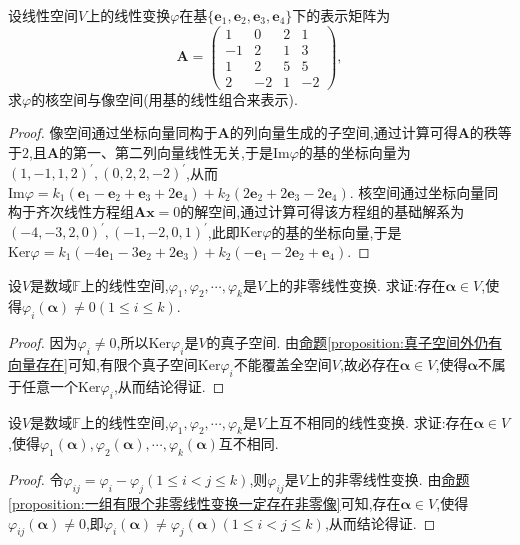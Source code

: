 \documentclass[lang=cn,newtx,10pt,scheme=chinese]{elegantbook}
\begin{document}
\begin{example}
设线性空间\(V\)上的线性变换\(\varphi\)在基\(\{\boldsymbol{e}_1,\boldsymbol{e}_2,\boldsymbol{e}_3,\boldsymbol{e}_4\}\)下的表示矩阵为
\[
\boldsymbol{A}=\begin{pmatrix}
1&0&2&1\\
-1&2&1&3\\
1&2&5&5\\
2&-2&1&-2
\end{pmatrix},
\]
求\(\varphi\)的核空间与像空间(用基的线性组合来表示).
\end{example}
\begin{proof}
像空间通过坐标向量同构于\(\boldsymbol{A}\)的列向量生成的子空间,通过计算可得\(\boldsymbol{A}\)的秩等于\(2\),且\(\boldsymbol{A}\)的第一、第二列向量线性无关,于是\(\text{Im}\varphi\)的基的坐标向量为\((1,-1,1,2)^\prime,(0,2,2,-2)^\prime\),从而\(\text{Im}\varphi = k_1(\boldsymbol{e}_1 - \boldsymbol{e}_2 + \boldsymbol{e}_3 + 2\boldsymbol{e}_4)+k_2(2\boldsymbol{e}_2 + 2\boldsymbol{e}_3 - 2\boldsymbol{e}_4)\). 核空间通过坐标向量同构于齐次线性方程组\(\boldsymbol{A}\boldsymbol{x}=0\)的解空间,通过计算可得该方程组的基础解系为\((-4,-3,2,0)^\prime,(-1,-2,0,1)^\prime\),此即\(\text{Ker}\varphi\)的基的坐标向量,于是\(\text{Ker}\varphi = k_1(-4\boldsymbol{e}_1 - 3\boldsymbol{e}_2 + 2\boldsymbol{e}_3)+k_2(-\boldsymbol{e}_1 - 2\boldsymbol{e}_2 + \boldsymbol{e}_4)\).
\end{proof}

\begin{proposition}\label{proposition:一组有限个非零线性变换一定存在非零像}
设\(V\)是数域\(\mathbb{F}\)上的线性空间,\(\varphi_1,\varphi_2,\cdots,\varphi_k\)是\(V\)上的非零线性变换. 求证:存在\(\boldsymbol{\alpha}\in V\),使得\(\varphi_i(\boldsymbol{\alpha})\neq 0(1\leq i\leq k)\).
\end{proposition}
\begin{proof}
因为\(\varphi_i\neq 0\),所以\(\text{Ker}\varphi_i\)是\(V\)的真子空间. 由\hyperref[proposition:真子空间外仍有向量存在]{命题\ref{proposition:真子空间外仍有向量存在}}可知,有限个真子空间\(\text{Ker}\varphi_i\)不能覆盖全空间\(V\),故必存在\(\boldsymbol{\alpha}\in V\),使得\(\boldsymbol{\alpha}\)不属于任意一个\(\text{Ker}\varphi_i\),从而结论得证.
\end{proof}

\begin{proposition}\label{proposition:一组有限个非零线性变换一定存在互不相同的像}
设\(V\)是数域\(\mathbb{F}\)上的线性空间,\(\varphi_1,\varphi_2,\cdots,\varphi_k\)是\(V\)上互不相同的线性变换. 求证:存在\(\boldsymbol{\alpha}\in V\),使得\(\varphi_1(\boldsymbol{\alpha}),\varphi_2(\boldsymbol{\alpha}),\cdots,\varphi_k(\boldsymbol{\alpha})\)互不相同.
\end{proposition}
\begin{proof}
令\(\varphi_{ij}=\varphi_i - \varphi_j(1\leq i<j\leq k)\),则\(\varphi_{ij}\)是\(V\)上的非零线性变换. 由\hyperref[proposition:一组有限个非零线性变换一定存在非零像]{命题\ref{proposition:一组有限个非零线性变换一定存在非零像}}可知,存在\(\boldsymbol{\alpha}\in V\),使得\(\varphi_{ij}(\boldsymbol{\alpha})\neq 0\),即\(\varphi_i(\boldsymbol{\alpha})\neq\varphi_j(\boldsymbol{\alpha})(1\leq i<j\leq k)\),从而结论得证. 
\end{proof}
\end{document}
